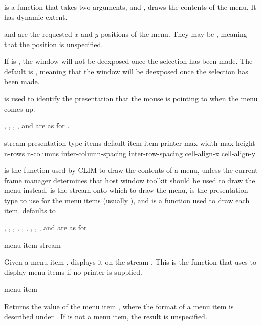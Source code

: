  is a function that takes two arguments,  and
, draws the contents of the menu.  It has dynamic extent.

 and  are the requested $x$ and $y$ positions of
the menu.  They may be , meaning that the position is unspecified.

If  is , the window will not be deexposed
once the selection has been made. The default is , meaning that the
window will be deexposed once the selection has been made.

 is used to identify the presentation that the mouse
is pointing to when the menu comes up.

, , , , and
 are as for .

 {stream presentation-type items default-item
                             \key item-printer
                                  max-width max-height n-rows n-columns
                                  inter-column-spacing inter-row-spacing 
                                  cell-align-x cell-align-y}

 is the function used by CLIM to draw the contents of a
menu, unless the current frame manager determines that host window toolkit
should be used to draw the menu instead.   is the stream onto which
to draw the menu,  is the presentation type to use for
the menu items (usually ), and  is a function
used to draw each item.   defaults to .

, , , ,
, , ,
, , and  are as for

 {menu-item \optional stream}

Given a menu item , displays it on the stream . This
is the function that  uses to display menu items if no printer
is supplied.


 {menu-item}

Returns the value of the menu item , where the format of a menu
item is described under .  If  is not a menu item,
the result is unspecified.

